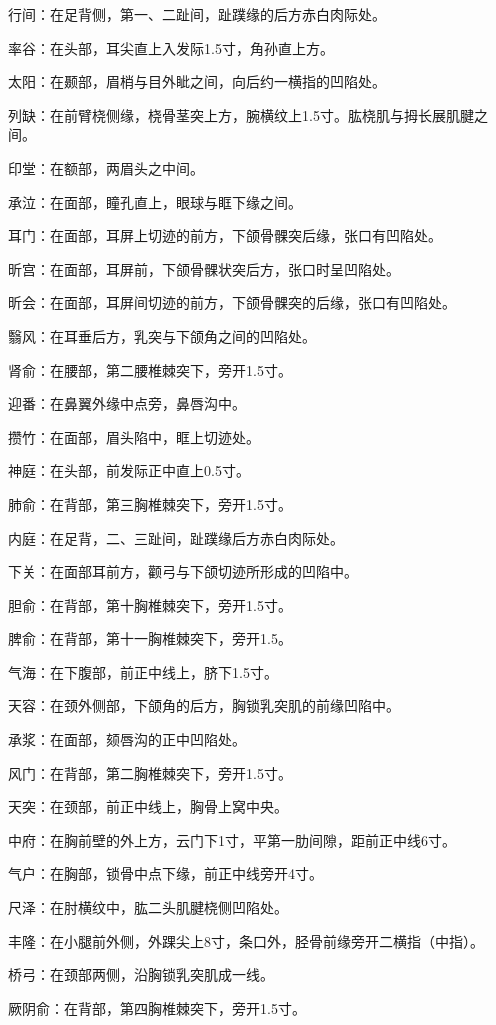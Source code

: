 \documentclass[12pt,UTF8,openany]{ctexbook}
\begin{document}
行间：在足背侧，第一、二趾间，趾蹼缘的后方赤白肉际处。

率谷：在头部，耳尖直上入发际1.5寸，角孙直上方。

太阳：在颞部，眉梢与目外眦之间，向后约一横指的凹陷处。

列缺：在前臂桡侧缘，桡骨茎突上方，腕横纹上1.5寸。肱桡肌与拇长展肌腱之间。

印堂：在额部，两眉头之中间。

承泣：在面部，瞳孔直上，眼球与眶下缘之间。

耳门：在面部，耳屏上切迹的前方，下颌骨髁突后缘，张口有凹陷处。

昕宫：在面部，耳屏前，下颌骨髁状突后方，张口时呈凹陷处。

昕会：在面部，耳屏间切迹的前方，下颌骨髁突的后缘，张口有凹陷处。

翳风：在耳垂后方，乳突与下颌角之间的凹陷处。

肾俞：在腰部，第二腰椎棘突下，旁开1.5寸。

迎番：在鼻翼外缘中点旁，鼻唇沟中。

攒竹：在面部，眉头陷中，眶上切迹处。

神庭：在头部，前发际正中直上0.5寸。

肺俞：在背部，第三胸椎棘突下，旁开1.5寸。

内庭：在足背，二、三趾间，趾蹼缘后方赤白肉际处。

下关：在面部耳前方，颧弓与下颌切迹所形成的凹陷中。

胆俞：在背部，第十胸椎棘突下，旁开1.5寸。

脾俞：在背部，第十一胸椎棘突下，旁开1.5。

气海：在下腹部，前正中线上，脐下1.5寸。

天容：在颈外侧部，下颌角的后方，胸锁乳突肌的前缘凹陷中。

承浆：在面部，颏唇沟的正中凹陷处。

风门：在背部，第二胸椎棘突下，旁开1.5寸。

天突：在颈部，前正中线上，胸骨上窝中央。

中府：在胸前壁的外上方，云门下1寸，平第一肋间隙，距前正中线6寸。

气户：在胸部，锁骨中点下缘，前正中线旁开4寸。

尺泽：在肘横纹中，肱二头肌腱桡侧凹陷处。

丰隆：在小腿前外侧，外踝尖上8寸，条口外，胫骨前缘旁开二横指（中指）。

桥弓：在颈部两侧，沿胸锁乳突肌成一线。

厥阴俞：在背部，第四胸椎棘突下，旁开1.5寸。
\end{document}
